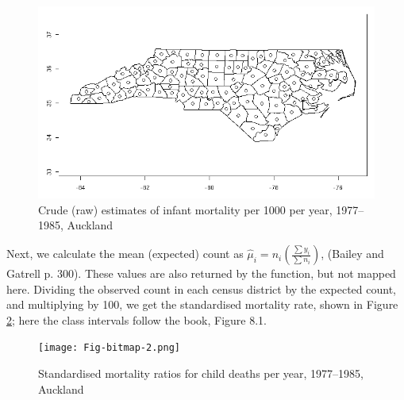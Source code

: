 \documentclass[a4paper,10pt]{article}
\begin{document}
\begin{figure}[htbp]
\begin{center} 
\begin{Schunk}
\includegraphics{Fig-bitmap-1.png}\end{Schunk}
\end{center}
\caption{Crude (raw) estimates of infant mortality per 1000 per year, 1977--1985, Auckland}
\label{raw}
\end{figure}


\begin{footnotesize}
\begin{Schunk}
\end{Schunk}
\begin{Schunk}
\end{Schunk}
\end{footnotesize}
Next, we calculate the mean (expected) count as $\hat{\mu}_i = n_i ( )$, (Bailey and Gatrell p. 300). These values are also returned by the function, but not mapped here. Dividing the observed count in each census district by the expected count, and multiplying by 100, we get the standardised mortality rate, shown in Figure \ref{rel}; here the class intervals follow the book, Figure 8.1.

\begin{figure}[htbp]
\begin{center} 
\begin{Schunk}
\texttt{[image: Fig-bitmap-2.png]}\end{Schunk}
\end{center}
\caption{Standardised mortality ratios for child deaths per year, 1977--1985, Auckland}
\label{rel}
\end{figure}
\end{document}
